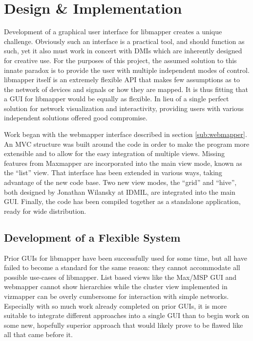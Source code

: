 \chapter{Design \& Implementation}

	Development of a graphical user interface for libmapper creates a unique challenge. Obviously such an interface is a practical tool, and should function as such, yet it also must work in concert with DMIs which are inherently designed for creative use. For the purposes of this project, the assumed solution to this innate paradox is to provide the user with multiple independent modes of control.  libmapper itself is an extremely flexible API that makes few assumptions as to the network of devices and signals or how they are mapped. It is thus fitting that a GUI for libmapper would be equally as flexible. In lieu of a single perfect solution for network visualization and interactivity, providing users with various independent solutions offered good compromise.

	Work began with the webmapper interface described in section \ref{sub:webmapper}. An MVC structure was built around the code in order to make the program more extensible and to allow for the easy integration of multiple views. Missing features from Maxmapper are incorporated into the main view mode, known as the ``list'' view. That interface has been extended in various ways, taking advantage of the new code base. Two new view modes, the ``grid'' and ``hive'', both designed by Jonathan Wilansky at IDMIL, are integrated into the main GUI. Finally, the code has been compiled together as a standalone application, ready for wide distribution.

\section{Development of a Flexible System} %
\label{sec:development_of_a_flexible_system}

Prior GUIs for libmapper have been successfully used for some time, but all have failed to become a standard for the same reason: they cannot accommodate all possible use-cases of libmapper. List based views like the Max/MSP GUI and webmapper cannot show hierarchies while the cluster view implemented in vizmapper can be overly cumbersome for interaction with simple networks. Especially with so much work already completed on prior GUIs, it is more suitable to integrate different approaches into a single GUI than to begin work on some new, hopefully superior approach that would likely prove to be flawed like all that came before it. 

